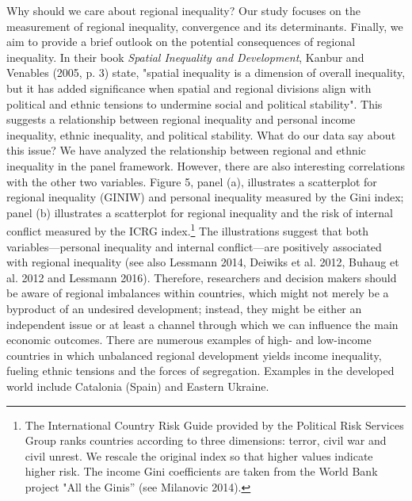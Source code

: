\documentclass[10pt]{article}
\begin{document}
Why should we care about regional inequality? 
Our study focuses on the measurement of regional inequality, convergence and its determinants. 
Finally, we aim to provide a brief outlook on the potential consequences of regional inequality. 
In their book \textit{Spatial Inequality and Development}, Kanbur and Venables (2005, p. 3) state, "spatial inequality is a dimension of overall inequality, but it has added significance when spatial and regional divisions align with political and ethnic tensions to undermine social and political stability". 
This suggests a relationship between regional inequality and personal income inequality, ethnic inequality, and political stability. 
What do our data say about this issue? 
We have analyzed the relationship between regional and ethnic inequality in the panel framework. 
However, there are also interesting correlations with the other two variables. 
Figure 5, panel (a), illustrates a scatterplot for regional inequality (GINIW) and personal inequality measured by the Gini index; panel (b) illustrates a scatterplot for regional inequality and the risk of internal conflict measured by the ICRG index.\footnote{
The International Country Risk Guide provided by the Political Risk Services Group ranks countries according to three dimensions: terror, civil war and civil unrest.
We rescale the original index so that higher values indicate higher risk.
The income Gini coefficients are taken from the World Bank project "All the Ginis” (see Milanovic 2014).
} 
The illustrations suggest that both variables---personal inequality and internal conflict---are positively associated with regional inequality (see also Lessmann 2014, Deiwiks et al. 2012, Buhaug et al. 2012 and Lessmann 2016). 
Therefore, researchers and decision makers should be aware of regional imbalances within countries, which might not merely be a byproduct of an undesired development; instead, they might be either an independent issue or at least a channel through which we can influence the main economic outcomes. 
There are numerous examples of high- and low-income countries in which unbalanced regional development yields income inequality, fueling ethnic tensions and the forces of segregation. 
Examples in the developed world include Catalonia (Spain) and Eastern Ukraine.
\end{document}
